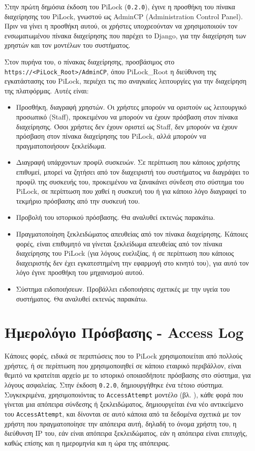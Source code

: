 Στην πρώτη δημόσια έκδοση του PiLock (\verb|0.2.0|), έγινε η προσθήκη του πίνακα διαχείρησης του PiLock, γνωστού ως AdminCP (Administration Control Panel). Πριν να γίνει η προσθήκη αυτού, οι χρήστες υποχρεούνταν να χρησιμοποιούν τον ενσωματωμένου πίνακα διαχείρησης που παρέχει το Django, για την διαχείρηση των χρηστών και τον μοντέλων του συστήματος.

Στον πυρήνα του, ο πίνακας διαχείρησης, προσβάσιμος στο \verb|https://<PiLock_Root>/AdminCP|, όπου PiLock\_Root η διεύθυνση της εγκατάστασης του PiLock, περιέχει τις πιο αναγκαίες λειτουργίες για την διαχείρηση της πλατφόρμας. Αυτές είναι:

\begin{itemize}
	\item Προσθήκη, διαγραφή χρηστών. Οι χρήστες μπορούν να οριστούν ως λειτουργικό προσωπικό (Staff), προκειμένου να μπορούν να έχουν πρόσβαση στον πίνακα διαχείρησης. Όσοι χρήστες δεν έχουν οριστεί ως Staff, δεν μπορούν να έχουν πρόσβαση στον πίνακα διαχείρησης του PiLock, αλλά μπορούν να πραγματοποιήσουν ξεκλείδωμα.
	\item Διαγραφή υπάρχοντων προφίλ συσκευών. Σε περίπτωση που κάποιος χρήστης επιθυμεί, μπορεί να ζητήσει από τον διαχειριστή του συστήματος να διαγράψει το προφίλ της συσκευής του, προκειμένου να ξανακάνει σύνδεση στο σύστημα του PiLock, σε περίπτωση που χαθεί η συσκευή του ή για κάποιο λόγο διαγραφεί το τεκμήριο πρόσβασης από την συσκευή του.
	\item Προβολή του ιστορικού πρόσβασης. Θα αναλυθεί εκτενώς παρακάτω.
	\item Πραγματοποίηση ξεκλειδώματος απευθείας από τον πίνακα διαχείρησης. Κάποιες φορές, είναι επιθυμητό να γίνεται ξεκλείδωμα απευθείας από τον πίνακα διαχείρησης του PiLock (για λόγους ευελιξίας, ή σε περίπτωση που κάποιος διαχειριστής δεν έχει εγκατεστημένη την εφαρμογή στο κινητό του), για αυτό τον λόγο έγινε προσθήκη του μηχανισμού αυτού.  %
	\item Σύστημα ειδοποιήσεων. Προβάλλει ειδοποιήσεις σχετικές με την υγεία του συστήματος. Θα αναλυθεί εκτενώς παρακάτω.
\end{itemize}

\section{Ημερολόγιο Πρόσβασης - Access Log}
	Κάποιες φορές, ειδικά σε περιπτώσεις που το PiLock χρησιμοποιείται από πολλούς χρήστες, ή σε περίπτωση που χρησιμοποιηθεί σε κάποιο εταιρικό περιβάλλον, είναι θεμιτό να κρατείται αρχείο με το ιστορικό οποιασδήποτε πρόσβασης στο σύστημα, για λόγους ασφαλείας. Στην έκδοση \verb|0.2.0|, δημιουργήθηκε ένα τέτοιο σύστημα. Συγκεκριμένα, χρησιμοποιόντας το \verb|AccessAttempt| μοντέλο (βλ. ), κάθε φορά που γίνεται μια απόπειρα σύνδεσης ή ξεκλειδώματος, δημιουργείται ένα νέο αντικείμενο του \verb|AccessAttempt|, και δίνονται σε αυτό κάποια από τα δεδομένα σχετικά με τον χρήστη που πραγματοποίησε την απόπειρα αυτή, δηλαδή το όνομα χρήστη του, η διεύθυνση IP του, εάν είναι απόπειρα ξεκλειδώματος, εάν η απόπειρα είναι επιτυχής, καθώς επίσης και η ημερομηνία και η ώρα της απόπειρας.

